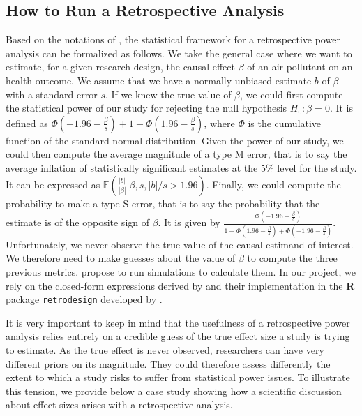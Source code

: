 \documentclass[12pt]{article}
\begin{document}
    \subsection{How to Run a Retrospective Analysis}
    
    Based on the notations of \cite{zwet_significance_2021}, the statistical framework for a retrospective power analysis can be formalized as follows. We take the general case where we want to estimate, for a given research design, the causal effect $\beta$ of an air pollutant on an health outcome. We assume that we have a normally unbiased estimate $b$ of $\beta$ with a standard error $s$. If we knew the true value of $\beta$, we could first compute the statistical power of our study for rejecting the null hypothesis $H_{0}: \beta = 0$. It is defined as $\Phi(-1.96-\frac{\beta}{s})+1-\Phi(1.96-\frac{\beta}{s})$, where $\Phi$ is the cumulative function of the standard normal distribution. Given the power of our study, we could then compute the average magnitude of a type M error, that is to say the average inflation of statistically significant estimates at the 5\% level for the study. It can be expressed as $\mathbb{E}(\frac{|b|}{|\beta|} | \beta, s, |b|/s>1.96)$. Finally, we could compute the probability to make a type S error, that is to say the probability that the estimate is of the opposite sign of $\beta$. It is given by $\frac{\Phi(-1.96-\frac{\beta}{s})}{1-\Phi(1.96-\frac{\beta}{s}) + \Phi(-1.96 - \frac{\beta}{s})}$. Unfortunately, we never observe the true value of the causal estimand of interest. We therefore need to make guesses about the value of $\beta$ to compute the three previous metrics. \cite{gelman_beyond_2014} propose to run simulations to calculate them. In our project, we rely on the closed-form expressions derived by \cite{lu_note_2019} and their implementation in the \textbf{\textsf{R}} package \texttt{retrodesign} developed by \cite{timm_retrodesign_2019}.
    
    It is very important to keep in mind that the usefulness of a retrospective power analysis relies entirely on a credible guess of the true effect size a study is trying to estimate. As the true effect is never observed, researchers can have very different priors on its magnitude. They could therefore assess differently the extent to which a study risks to suffer from statistical power issues. To illustrate this tension, we provide below a case study showing how a scientific discussion about effect sizes arises with a retrospective analysis. 
    
\end{document}
